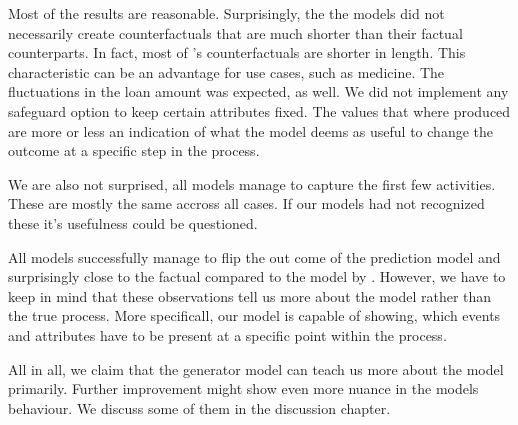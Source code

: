 \documentclass[./../../paper.tex]{subfiles}
\begin{document}
Most of the results are reasonable. Surprisingly, the the models did not necessarily create counterfactuals that are much shorter than their factual counterparts. In fact, most of \citeauthor{hsieh_DiCE4ELInterpretingProcess_2021}'s counterfactuals are shorter in length.  This characteristic can be an advantage for use cases, such as medicine. The fluctuations in the loan amount was expected, as well. We did not implement any safeguard option to keep certain attributes fixed. The values that where produced are more or less an indication of what the model deems as useful to change the outcome at a specific step in the process. 

We are also not surprised, all models manage to capture the first few activities. These are mostly the same accross all cases. If our models had not recognized these it's usefulness could be questioned. 

All models successfully manage to flip the out come of the prediction model and surprisingly close to the factual compared to the model by \citeauthor{hsieh_DiCE4ELInterpretingProcess_2021}. However, we have to keep in mind that these observations tell us more about the model rather than the true process. More specificall, our model is capable of showing, which events and attributes have to be present at a specific point within the process. 
   

All in all, we claim that the generator model can teach us more about the model primarily. Further improvement might show even more nuance in the models behaviour. We discuss some of them in the discussion chapter.
\end{document}
